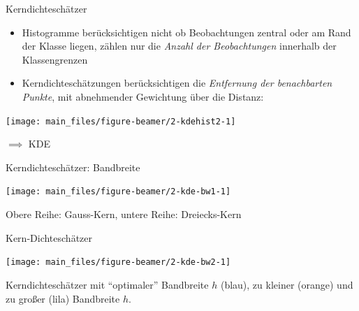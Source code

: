\documentclass[
  10pt,
  ignorenonframetext,
]{beamer}
\providecommand{\tightlist}{%
  \setlength{\itemsep}{0pt}\setlength{\parskip}{0pt}}
\begin{document}
\begin{frame}{Kerndichteschätzer}
\label{kerndichteschuxe4tzer-3}
\begin{itemize}
\tightlist
\item
  Histogramme berücksichtigen nicht ob Beobachtungen zentral oder am
  Rand der Klasse liegen, zählen nur die \emph{Anzahl der Beobachtungen}
  innerhalb der Klassengrenzen
\item
  Kerndichteschätzungen berücksichtigen die \emph{Entfernung der
  benachbarten Punkte}, mit abnehmender Gewichtung über die Distanz:
\end{itemize}

\scriptsize

\begin{center}\texttt{[image: main\_files/figure-beamer/2-kdehist2-1]} \end{center}

\normalsize

\(\implies\) KDE
\end{frame}

\begin{frame}{Kerndichteschätzer: Bandbreite}
\label{kerndichteschuxe4tzer-bandbreite}
\scriptsize

\begin{center}\texttt{[image: main\_files/figure-beamer/2-kde-bw1-1]} \end{center}

\normalsize

Obere Reihe: Gauss-Kern, untere Reihe: Dreiecks-Kern
\end{frame}

\begin{frame}{Kern-Dichteschätzer}
\label{kern-dichteschuxe4tzer}
\scriptsize

\begin{center}\texttt{[image: main\_files/figure-beamer/2-kde-bw2-1]} \end{center}

\normalsize

Kerndichteschätzer mit ``optimaler'' Bandbreite \(h\) (blau), zu kleiner
(orange) und zu großer (lila) Bandbreite \(h\).
\end{frame}
\end{document}
